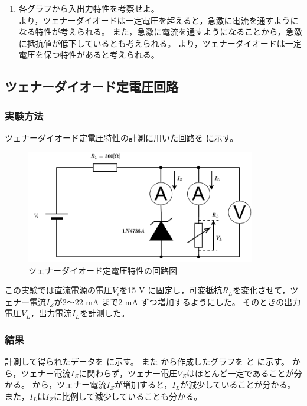 \begin{enumerate}
   	\item 各グラフから入出力特性を考察せよ。\\
     
		 より，ツェナーダイオードは一定電圧を超えると，急激に電流を通すようになる特性が考えられる。
		また，急激に電流を通すようになることから，急激に抵抗値が低下しているとも考えられる。
		 より，ツェナーダイオードは一定電圧を保つ特性があると考えられる。
		
	\end{enumerate}

\subsection{ツェナーダイオード定電圧回路}
\subsubsection{実験方法}
	ツェナーダイオード定電圧特性の計測に用いた回路を に示す。

	\begin{figure}[!h]
		\centering
		\includegraphics[width=10cm]{./pdfs/zener_diode2.pdf}
		\caption{ツェナーダイオード定電圧特性の回路図}
		\label{fig:zenerDiode2_circuit}
	\end{figure}

	この実験では直流電源の電圧$V_i$を15 V に固定し，可変抵抗$R_L$を変化させて，ツェナー電流$I_Z$が2～22 mA まで2 mA ずつ増加するようにした。
	そのときの出力電圧$V_L$，出力電流$I_L$を計測した。

\subsubsection{結果}
	計測して得られたデータを に示す。
	また から作成したグラフを と に示す。
	 から，ツェナー電流$I_Z$に関わらず，ツェナー電圧$V_Z$はほとんど一定であることが分かる。
	 から，ツェナー電流$I_Z$が増加すると，$I_L$が減少していることが分かる。
	また，$I_L$は$I_Z$に比例して減少していることも分かる。

